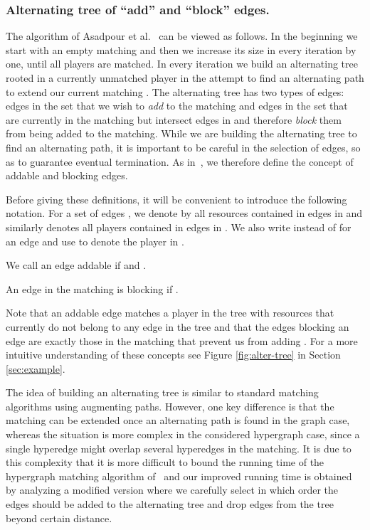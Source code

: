 \documentclass{llncs}
\begin{document}
\subsubsection{Alternating tree of ``add'' and ``block'' edges.}

The algorithm of Asadpour et al.~\cite{AFS08} can be viewed as
follows. In the beginning we start with an empty matching and then we
increase its size in every iteration by one, until all players are
matched. In every iteration we build an alternating tree rooted in a
currently unmatched player  in the attempt to find an alternating
path to extend our current matching . The alternating tree has two
types of edges: edges in the set  that we wish to \emph{add} to the
matching and edges in the set  that are currently in the matching
but intersect edges in  and therefore \emph{block} them from being
added to the matching. While we are building the alternating tree to
find an alternating path, it is important to be careful in the
selection of edges, so as to guarantee eventual termination. As
in~\cite{AFS08}, we therefore define the concept of addable and
blocking edges.

Before giving these definitions, it will be convenient to introduce
the following notation. For a set of edges , we denote by 
all resources contained in edges in  and similarly 
denotes all players contained in edges in . We also write 
instead of  for an edge  and use  to denote
the player in .

\begin{definition}
We call an edge  addable if  and
.
\end{definition}
\begin{definition}
An edge  in the matching  is blocking  if
.
\end{definition}
Note that an addable edge matches a player in the tree with resources
that currently do not belong to any edge in the tree and that the
edges blocking an edge  are exactly those in the matching that
prevent us from adding . For a more intuitive understanding of
these concepts see Figure \ref{fig:alter-tree} in Section \ref{sec:example}.

The idea of building an alternating tree is similar to standard matching
algorithms using augmenting paths. However, one key difference is that the matching can be
extended once an alternating path is found in the graph case, whereas
the situation is more complex in the considered hypergraph case, since
a single hyperedge might overlap several hyperedges in the matching. It is due
to this complexity that it is more difficult to bound the running time
of the hypergraph matching algorithm of~\cite{AFS08} and our improved
running time is obtained by analyzing a modified version where we
carefully select in which order the edges should be added to the
alternating tree and drop edges from the tree beyond certain distance.
\end{document}
